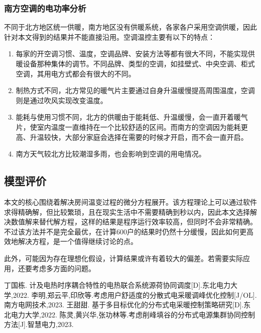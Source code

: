\documentclass[withoutpreface,bwprint]{cumcmthesis} %
\begin{document}
\subsubsection{南方空调的电功率分析}
不同于北方地区统一供暖，南方地区没有供暖系统，各家各户采用空调供暖，因此针对本文得到的结果并不能直接沿用。空调温控主要有以下的特点：
\begin{enumerate}
	\item 每家的开空调习惯、温度，空调品牌、安装方法等都有很大不同，不能实现供暖设备那种集体的调节。不同品牌、类型的空调，如挂壁式、中央空调、柜式空调，其用电方式都会有很大的不同。
	\item 制热方式不同，北方常见的暖气片主要通过自身升温缓慢提高周围温度，空调则是通过吹风实现改变温度。
	\item 能耗与使用习惯不同，北方的供暖由于能耗低、升温缓慢，会一直开着暖气片，使室内温度一直维持在一个比较舒适的区间。而南方的空调因为能耗更高、升温较快，大部分家庭会选择在需要的时候才开启，而不会一直开启。
	\item 南方天气较北方比较潮湿多雨，也会影响到空调的用电情况。
\end{enumerate}

\subsection{模型评价}
本文的核心围绕着解决房间温变过程的微分方程展开。该方程理论上可以通过软件求得精确解，但比较繁琐，且在现实生活中不需要精确到秒以内，因此本文选择解决数值解来替代解方程，这样的结果是程序运行效率较高，但同时不会非常精确。不过该方法并不是完全最优，在计算600户的结果时仍然十分缓慢，因此如何更高效地解决方程，是一个值得继续讨论的点。

此外，可能因为存在理想化假设，计算结果或许有着较大的偏差。若需要实际应用，还要考虑多方面的问题。
\newpage
\begin{thebibliography}{9}%
丁国栋. 计及电热时序耦合特性的电热联合系统源荷协同调度[D].东北电力大学,2022.
李明,郑云平,印欣等.考虑用户舒适度的分散式电采暖调峰优化控制[J/OL].南方电网技术,2023.
王甜甜. 基于多目标优化的分布式电采暖控制策略研究[D].东北电力大学,2022.
陈灵,黄兴华,张功林等.考虑削峰填谷的分布式电源集群协同控制方法[J].智慧电力,2023.
\end{thebibliography}
\end{document}
